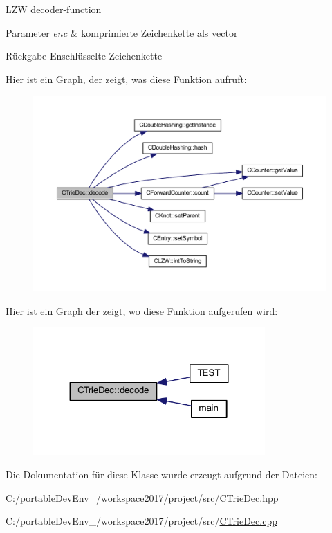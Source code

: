 L\+ZW decoder-\/function 
\begin{DoxyParams}{Parameter}
{\em enc} & komprimierte Zeichenkette als vector \\
\hline
\end{DoxyParams}
\begin{DoxyReturn}{Rückgabe}
Enschlüsselte Zeichenkette 
\end{DoxyReturn}
Hier ist ein Graph, der zeigt, was diese Funktion aufruft\+:
\nopagebreak
\begin{figure}[H]
\begin{center}
\leavevmode
\includegraphics[width=350pt]{class_c_trie_dec_a190f82222a2f7881b940066c54b00d38_cgraph}
\end{center}
\end{figure}
Hier ist ein Graph der zeigt, wo diese Funktion aufgerufen wird\+:
\nopagebreak
\begin{figure}[H]
\begin{center}
\leavevmode
\includegraphics[width=251pt]{class_c_trie_dec_a190f82222a2f7881b940066c54b00d38_icgraph}
\end{center}
\end{figure}


Die Dokumentation für diese Klasse wurde erzeugt aufgrund der Dateien\+:\begin{DoxyCompactItemize}
\item 
C\+:/portable\+Dev\+Env\+\_/workspace2017/project/src/\hyperlink{_c_trie_dec_8hpp}{C\+Trie\+Dec.\+hpp}\item 
C\+:/portable\+Dev\+Env\+\_/workspace2017/project/src/\hyperlink{_c_trie_dec_8cpp}{C\+Trie\+Dec.\+cpp}\end{DoxyCompactItemize}
